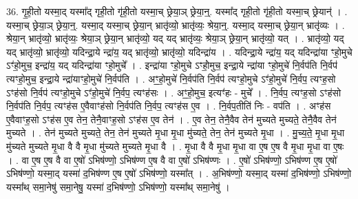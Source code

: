 \documentclass[17pt]{extarticle}
\begin{document}
36. गृ॒ही॒तो यस्मा॒द् यस्मा᳚द् गृही॒तो गृ॑ही॒तो यस्मा॒च् छ्रेया॒ञ् छ्रेया॒न्॒. यस्मा᳚द् गृही॒तो गृ॑ही॒तो यस्मा॒च् छ्रेयान्॑ । . यस्मा॒च् छ्रेया॒ञ् छ्रेया॒न्॒. यस्मा॒द् यस्मा॒च् छ्रेया॒न् भ्रातृ॑व्यो॒ भ्रातृ॑व्यः॒ श्रेया॒न्॒. यस्मा॒द् यस्मा॒च् छ्रेया॒न् भ्रातृ॑व्यः । . श्रेया॒न् भ्रातृ॑व्यो॒ भ्रातृ॑व्यः॒ श्रेया॒ञ् छ्रेया॒न् भ्रातृ॑व्यो॒ यद् यद् भ्रातृ॑व्यः॒ श्रेया॒ञ् छ्रेया॒न् भ्रातृ॑व्यो॒ यत् । . भ्रातृ॑व्यो॒ यद् यद् भ्रातृ॑व्यो॒ भ्रातृ॑व्यो॒ यदिन्द्रा॒ये न्द्रा॑य॒ यद् भ्रातृ॑व्यो॒ भ्रातृ॑व्यो॒ यदिन्द्रा॑य । . यदिन्द्रा॒ये न्द्रा॑य॒ यद् यदिन्द्रा॑या ꣳहो॒मुचे ऽꣳ॑हो॒मुच॒ इन्द्रा॑य॒ यद् यदिन्द्रा॑या ꣳहो॒मुचे᳚ । . इन्द्रा॑या ꣳहो॒मुचे ऽꣳहो॒॑मुच॒ इन्द्रा॒ये न्द्रा॑या ꣳहो॒मुचे॑ नि॒र्वप॑ति नि॒र्वप॑ त्यꣳहो॒मुच॒ इन्द्रा॒ये न्द्रा॑याꣳहो॒मुचे॑ नि॒र्वप॑ति । . अꣳ॒॒हो॒मुचे॑ नि॒र्वप॑ति नि॒र्वप॑ त्यꣳहो॒मुचे ऽꣳ॑हो॒मुचे॑ नि॒र्वप॒ त्यꣳह॒सो ऽꣳह॑सो नि॒र्वप॑ 
त्यꣳहो॒मुचे ऽꣳ॑हो॒मुचे॑ नि॒र्वप॒ त्यꣳह॑सः । . अꣳ॒॒हो॒मुच॒ इत्यꣳ॑हः - मुचे᳚ । . नि॒र्वप॒ त्यꣳह॒सो ऽꣳह॑सो नि॒र्वप॑ति नि॒र्वप॒ त्यꣳह॑स ए॒वैवाꣳह॑सो नि॒र्वप॑ति नि॒र्वप॒ त्यꣳह॑स ए॒व । . नि॒र्वप॒तीति॑ निः - वप॑ति । . अꣳह॑स ए॒वैवाꣳह॒सो ऽꣳह॑स ए॒व तेन॒ तेनै॒वाꣳह॒सो ऽꣳह॑स ए॒व तेन॑ । . ए॒व तेन॒ तेनै॒वैव तेन॑ मुच्यते मुच्यते॒ तेनै॒वैव तेन॑ मुच्यते । . तेन॑ मुच्यते मुच्यते॒ तेन॒ तेन॑ मुच्यते मृ॒धा मृ॒धा मु॑च्यते॒ तेन॒ तेन॑ मुच्यते मृ॒धा । . मु॒च्य॒ते॒ मृ॒धा मृ॒धा मु॑च्यते मुच्यते मृ॒धा वै वै मृ॒धा मु॑च्यते मुच्यते मृ॒धा वै । . मृ॒धा वै वै मृ॒धा मृ॒धा वा ए॒ष ए॒ष वै मृ॒धा मृ॒धा वा ए॒षः । . वा ए॒ष ए॒ष वै वा ए॒षो॑ ऽभिष॑ण्णो॒ ऽभिष॑ण्ण ए॒ष वै वा ए॒षो॑ ऽभिष॑ण्णः । . ए॒षो॑ ऽभिष॑ण्णो॒ ऽभिष॑ण्ण ए॒ष ए॒षो॑ ऽभिष॑ण्णो॒ यस्मा॒द् यस्मा॑ द॒भिष॑ण्ण ए॒ष ए॒षो॑ ऽभिष॑ण्णो॒ यस्मा᳚त् । . अ॒भिष॑ण्णो॒ यस्मा॒द् यस्मा॑ द॒भिष॑ण्णो॒ ऽभिष॑ण्णो॒ यस्मा᳚थ् समा॒नेषु॑ समा॒नेषु॒ यस्मा॑ द॒भिष॑ण्णो॒ ऽभिष॑ण्णो॒ यस्मा᳚थ् समा॒नेषु॑ । \newline
\end{document}
